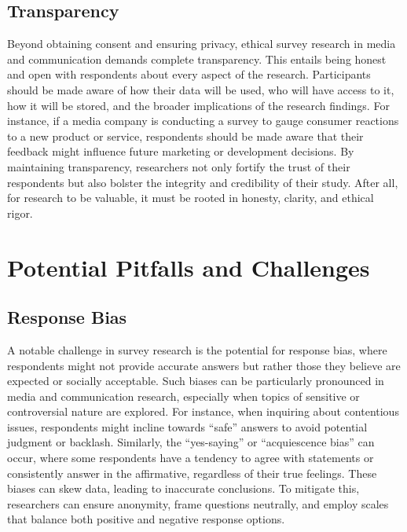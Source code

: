 \documentclass[
  b5paper]{book}
\begin{document}
\hypertarget{transparency}{%
\subsection*{Transparency}\label{transparency}}

Beyond obtaining consent and ensuring privacy, ethical survey research in media and communication demands complete transparency. This entails being honest and open with respondents about every aspect of the research. Participants should be made aware of how their data will be used, who will have access to it, how it will be stored, and the broader implications of the research findings. For instance, if a media company is conducting a survey to gauge consumer reactions to a new product or service, respondents should be made aware that their feedback might influence future marketing or development decisions. By maintaining transparency, researchers not only fortify the trust of their respondents but also bolster the integrity and credibility of their study. After all, for research to be valuable, it must be rooted in honesty, clarity, and ethical rigor.

\hypertarget{potential-pitfalls-and-challenges}{%
\section{Potential Pitfalls and Challenges}\label{potential-pitfalls-and-challenges}}

\hypertarget{response-bias}{%
\subsection*{Response Bias}\label{response-bias}}

A notable challenge in survey research is the potential for response bias, where respondents might not provide accurate answers but rather those they believe are expected or socially acceptable. Such biases can be particularly pronounced in media and communication research, especially when topics of sensitive or controversial nature are explored. For instance, when inquiring about contentious issues, respondents might incline towards ``safe'' answers to avoid potential judgment or backlash. Similarly, the ``yes-saying'' or ``acquiescence bias'' can occur, where some respondents have a tendency to agree with statements or consistently answer in the affirmative, regardless of their true feelings. These biases can skew data, leading to inaccurate conclusions. To mitigate this, researchers can ensure anonymity, frame questions neutrally, and employ scales that balance both positive and negative response options.
\end{document}
